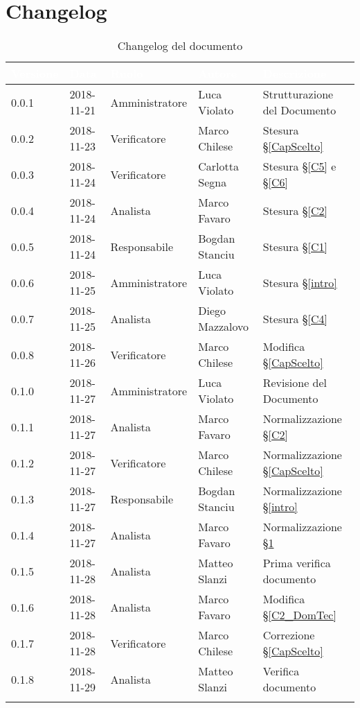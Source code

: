 \section{Changelog}\label{changelog}

\begin{center}
\begin{longtable}[c]{|m{}|m{}|m{}|m{}|p{}|}
\hline
\rowcolor{bluelogo}\textbf{\textcolor{white}{Versione}} & \textbf{\textcolor{white}{Data}}  & \textbf{\textcolor{white}{Ruolo}} & \textbf{\textcolor{white}{Autore}} & \textbf{\textcolor{white}{Descrizione}} \\
\hline \hline
\endfirsthead
0.0.1 & 2018-11-21  & Amministratore & Luca Violato & Strutturazione del Documento \\
\hline
\rowcolor{grigio}0.0.2 & 2018-11-23  & Verificatore & Marco Chilese & Stesura §\ref{CapScelto} \\
\hline
0.0.3 & 2018-11-24  & Verificatore & Carlotta Segna & Stesura §\ref{C5} e §\ref{C6} \\
\hline
\rowcolor{grigio}0.0.4 & 2018-11-24  & Analista & Marco Favaro & Stesura §\ref{C2} \\
\hline
0.0.5 & 2018-11-24  & Responsabile & Bogdan Stanciu & Stesura §\ref{C1}\\
\hline
\rowcolor{grigio}0.0.6 & 2018-11-25  & Amministratore & Luca Violato & Stesura §\ref{intro}\\
\hline
0.0.7 & 2018-11-25  & Analista & Diego Mazzalovo & Stesura §\ref{C4} \\
\hline
\rowcolor{grigio}0.0.8 & 2018-11-26  & Verificatore & Marco Chilese & Modifica §\ref{CapScelto} \\
\hline
0.1.0 & 2018-11-27  & Amministratore & Luca Violato & Revisione del Documento\\
\hline
\rowcolor{grigio}0.1.1 & 2018-11-27 & Analista & Marco Favaro  & Normalizzazione §\ref{C2}\\
\hline
0.1.2 & 2018-11-27  & Verificatore & Marco Chilese & Normalizzazione §\ref{CapScelto}\\
\hline
\rowcolor{grigio}0.1.3 & 2018-11-27  & Responsabile & Bogdan Stanciu & Normalizzazione §\ref{intro}\\
\hline
0.1.4 & 2018-11-27  & Analista & Marco Favaro & Normalizzazione §\ref{changelog}\\
\hline
\rowcolor{grigio}0.1.5 & 2018-11-28 & Analista & Matteo Slanzi & Prima verifica documento\\
\hline
0.1.6 & 2018-11-28 & Analista & Marco Favaro & Modifica §\ref{C2_DomTec}\\
\hline
\rowcolor{grigio}0.1.7 & 2018-11-28 & Verificatore & Marco Chilese  & Correzione §\ref{CapScelto}\\
\hline
0.1.8 & 2018-11-29 & Analista & Matteo Slanzi  & Verifica documento\\
\hline
\caption{Changelog del documento}
\end{longtable}
\end{center}
